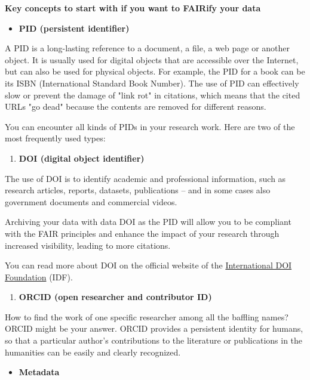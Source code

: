 \documentclass[
]{book}
\providecommand{\tightlist}{%
  \setlength{\itemsep}{0pt}\setlength{\parskip}{0pt}}
\begin{document}
\textbf{Key concepts to start with if you want to FAIRify your data}

\begin{itemize}
\tightlist
\item
  \textbf{PID (persistent identifier)}
\end{itemize}

A PID is a long-lasting reference to a document, a file, a web page or another object. It is usually used for digital objects that are accessible over the Internet, but can also be used for physical objects. For example, the PID for a book can be its ISBN (International Standard Book Number). The use of PID can effectively slow or prevent the damage of "link rot" in citations, which means that the cited URLs "go dead" because the contents are removed for different reasons.

You can encounter all kinds of PIDs in your research work. Here are two of the most frequently used types:

\begin{enumerate}
\def\labelenumi{\arabic{enumi}.}
\tightlist
\item
  \textbf{DOI (digital object identifier)}
\end{enumerate}

The use of DOI is to identify academic and professional information, such as research articles, reports, datasets, publications -- and in some cases also government documents and commercial videos.

Archiving your data with data DOI as the PID will allow you to be compliant with the FAIR principles and enhance the impact of your research through increased visibility, leading to more citations.

You can read more about DOI on the official website of the \href{https://www.doi.org/}{International DOI Foundation} (IDF).

\begin{enumerate}
\def\labelenumi{\arabic{enumi}.}
\tightlist
\item
  \textbf{ORCID (open researcher and contributor ID)}
\end{enumerate}

How to find the work of one specific researcher among all the baffling names? ORCID might be your answer. ORCID provides a persistent identity for humans, so that a particular author's contributions to the literature or publications in the humanities can be easily and clearly recognized.

\begin{itemize}
\tightlist
\item
  \textbf{Metadata}
\end{itemize}
\end{document}
